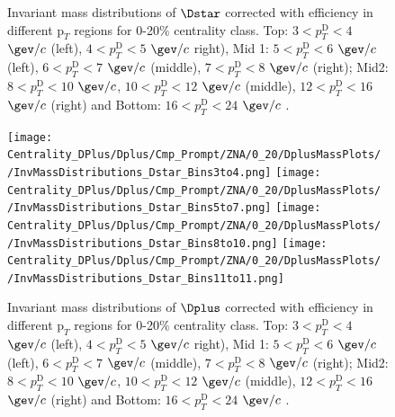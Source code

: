\begin{figure}[!htp]
\caption{Invariant mass distributions of $\Dstar$ corrected with efficiency in different $\text{p}_T$ regions for 0-20$\%$ centrality class. Top: $3< p_{T}^{\text{D}}< 4$ $\gev/c$ (left), $4< p_{T}^{\text{D}}< 5$ $\gev/c$ right), Mid 1: $5< p_{T}^{\text{D}}< 6$ $\gev/c$ (left), $6 < p_{T}^{\text{D}} < 7$ $\gev/c$ (middle), $7< p_{T}^{\text{D}}< 8$ $\gev/c$ (right); Mid2: $8< p_{T}^{\text{D}}< 10$ $\gev/c$, $10< p_{T}^{\text{D}}< 12$ $\gev/c$  (middle), $12 < p_{T}^{\text{D}}< 16$ $\gev/c$  (right) and Bottom: $16<p_{T}^{\text{D}}< 24$ $\gev/c$ .}
\label{fig:InvMassDs020}
\end{figure}



\begin{figure}[!htp]
\centering
{\texttt{[image: Centrality\_DPlus/Dplus/Cmp\_Prompt/ZNA/0\_20/DplusMassPlots/
/InvMassDistributions\_Dstar\_Bins3to4.png]}}
{\texttt{[image: Centrality\_DPlus/Dplus/Cmp\_Prompt/ZNA/0\_20/DplusMassPlots/
/InvMassDistributions\_Dstar\_Bins5to7.png]}}
{\texttt{[image: Centrality\_DPlus/Dplus/Cmp\_Prompt/ZNA/0\_20/DplusMassPlots/
/InvMassDistributions\_Dstar\_Bins8to10.png]}}
{\texttt{[image: Centrality\_DPlus/Dplus/Cmp\_Prompt/ZNA/0\_20/DplusMassPlots/
/InvMassDistributions\_Dstar\_Bins11to11.png]}}

\caption{Invariant mass distributions of $\Dplus$ corrected with efficiency in different $\text{p}_T$ regions for 0-20$\%$ centrality class. Top: $3< p_{T}^{\text{D}}< 4$ $\gev/c$ (left), $4< p_{T}^{\text{D}}< 5$ $\gev/c$ right), Mid 1: $5< p_{T}^{\text{D}}< 6$ $\gev/c$ (left), $6 < p_{T}^{\text{D}} < 7$ $\gev/c$ (middle), $7< p_{T}^{\text{D}}< 8$ $\gev/c$ (right); Mid2: $8< p_{T}^{\text{D}}< 10$ $\gev/c$, $10< p_{T}^{\text{D}}< 12$ $\gev/c$  (middle), $12 < p_{T}^{\text{D}}< 16$ $\gev/c$  (right) and Bottom: $16<p_{T}^{\text{D}}< 24$ $\gev/c$ .}
\label{fig:InvMassDplus020}
\end{figure}

